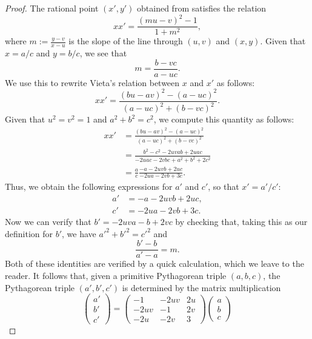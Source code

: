 \begin{proof}
  The rational point $(x',y')$ obtained from  satisfies the relation
  \begin{equation*}
    xx' = \frac{(mu-v)^2 -1}{1+m^2},
  \end{equation*}
  where $m:=\tfrac{y-v}{x-u}$ is the slope of the line through $(u,v)$ and $(x,y)$. Given that $x=a/c$ and $y=b/c$, we see that
  \begin{equation*}
    m=\frac{b-vc}{a-uc}.
  \end{equation*}
  We use this to rewrite Vieta's relation between $x$ and $x'$ as follows:
  \begin{equation*}
    xx' = \frac{(bu-av)^2-(a-uc)^2}{(a-uc)^2+(b-vc)^2}.
  \end{equation*}
  Given that $u^2=v^2=1$ and $a^2+b^2=c^2$, we compute this quantity as follows:
  \begin{align*}
    xx'
    & = \frac{(bu-av)^2-(a-uc)^2}{(a-uc)^2+(b-vc)^2} \\
    & = \frac{b^2-c^2-2uvab+2uac}{-2uac-2vbc + a^2+b^2+2c^2} \\
    & = \frac{a}{c}\frac{-a-2uvb+2uc}{-2ua-2vb + 3c}.
  \end{align*}
  Thus, we obtain the following expressions for $a'$ and $c'$, so that $x'=a'/c'$:
  \begin{align*}
    a' & = -a-2uvb+2uc, \\
    c' & = -2ua-2vb + 3c.
  \end{align*}
  Now we can verify that $b'=-2uva-b+2vc$ by checking that, taking this as our definition for $b'$, we have $a'^2+b'^2=c'^2$ and
  \begin{equation*}
    \frac{b'-b}{a'-a}=m.
  \end{equation*}
  Both of these identities are verified by a quick calculation, which we leave to the reader. It follows that, given a primitive Pythagorean triple $(a,b,c)$, the Pythagorean triple $(a',b',c')$ is determined by the matrix multiplication
  \begin{equation*}
    \begin{pmatrix}
      a' \\
      b' \\
      c'
    \end{pmatrix}
    =
    \begin{pmatrix}
      -1 & -2uv & 2u \\
      -2uv & -1 & 2v \\
      -2u & -2v & 3
    \end{pmatrix}
    \begin{pmatrix}
      a \\
      b \\
      c
    \end{pmatrix}
  \end{equation*}
  

\end{proof}
